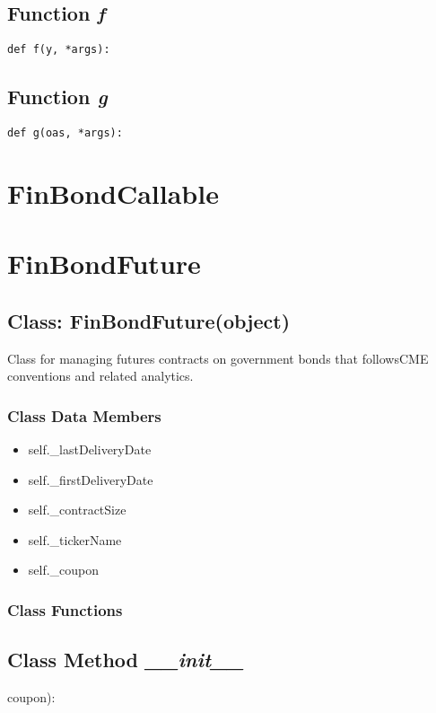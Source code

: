\documentclass[twoside,11pt]{book}
\begin{document}
\subsection{Function {\it f}}


\begin{lstlisting}
def f(y, *args):
\end{lstlisting}

\subsection{Function {\it g}}


\begin{lstlisting}
def g(oas, *args):
\end{lstlisting}

\newpage
\section{FinBondCallable}

\newpage
\section{FinBondFuture}

\subsection{Class: FinBondFuture(object)}
Class for managing futures contracts on government bonds that followsCME conventions and related analytics. 

\subsubsection{Class Data Members}
\begin{itemize}
\item{self.\_lastDeliveryDate}
\item{self.\_firstDeliveryDate}
\item{self.\_contractSize}
\item{self.\_tickerName}
\item{self.\_coupon}
\end{itemize}

\subsubsection{Class Functions}

\subsection{Class Method {\it \_\_init\_\_}}
coupon):
\end{document}
